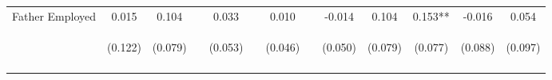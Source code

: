 \begin{tabular}{lcccccccccccc}
\noalign{\smallskip}Father Employed & 0.015 & 0.104 &  & 0.033 &  & 0.010 &  & -0.014 & 0.104 & 0.153** & -0.016 & 0.054\\
 & \begin{footnotesize}(0.122)\end{footnotesize} & \begin{footnotesize}(0.079)\end{footnotesize} & \begin{footnotesize}\end{footnotesize} & \begin{footnotesize}(0.053)\end{footnotesize} & \begin{footnotesize}\end{footnotesize} & \begin{footnotesize}(0.046)\end{footnotesize} & \begin{footnotesize}\end{footnotesize} & \begin{footnotesize}(0.050)\end{footnotesize} & \begin{footnotesize}(0.079)\end{footnotesize} & \begin{footnotesize}(0.077)\end{footnotesize} & \begin{footnotesize}(0.088)\end{footnotesize} & \begin{footnotesize}(0.097)\end{footnotesize}\\
\noalign{\smallskip}\hline\end{tabular}\\
